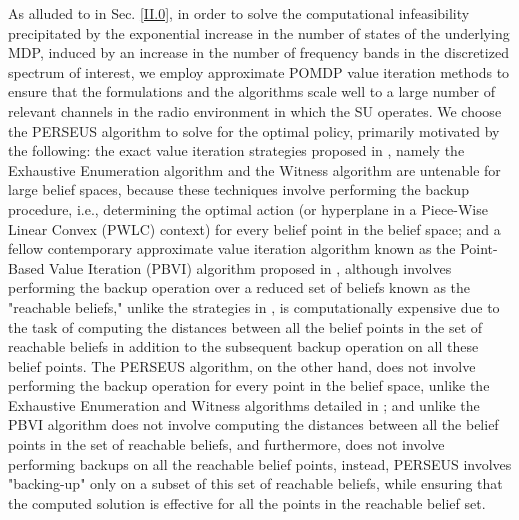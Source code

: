 \documentclass[12pt, draftcls, onecolumn]{IEEEtran}
\begin{document}
As alluded to in Sec. \ref{II.0}, in order to solve the computational infeasibility precipitated by the exponential increase in the number of states of the underlying MDP, induced by an increase in the number of frequency bands in the discretized spectrum of interest, we employ approximate POMDP value iteration methods to ensure that the formulations and the algorithms scale well to a large number of relevant channels in the radio environment in which the SU operates. We choose the PERSEUS algorithm \cite{WCL:13} to solve for the optimal policy, primarily motivated by the following: the exact value iteration strategies proposed in \cite{PUOccupancy:18}, namely the Exhaustive Enumeration algorithm and the Witness algorithm are untenable for large belief spaces, because these techniques involve performing the backup procedure, i.e., determining the optimal action (or hyperplane in a Piece-Wise Linear Convex (PWLC) context) for every belief point in the belief space; and a fellow contemporary approximate value iteration algorithm known as the Point-Based Value Iteration (PBVI) algorithm proposed in \cite{PUOccupancy:17}, although involves performing the backup operation over a reduced set of beliefs known as the "reachable beliefs," unlike the strategies in \cite{PUOccupancy:17}, is computationally expensive due to the task of computing the distances between all the belief points in the set of reachable beliefs in addition to the subsequent backup operation on all these belief points. The PERSEUS algorithm, on the other hand, does not involve performing the backup operation for every point in the belief space, unlike the Exhaustive Enumeration and Witness algorithms detailed in \cite{PUOccupancy:18}; and unlike the PBVI algorithm \cite{PUOccupancy:17} does not involve computing the distances between all the belief points in the set of reachable beliefs, and furthermore, does not involve performing backups on all the reachable belief points, instead, PERSEUS involves "backing-up" only on a subset of this set of reachable beliefs, while ensuring that the computed solution is effective for all the points in the reachable belief set.
\end{document}
